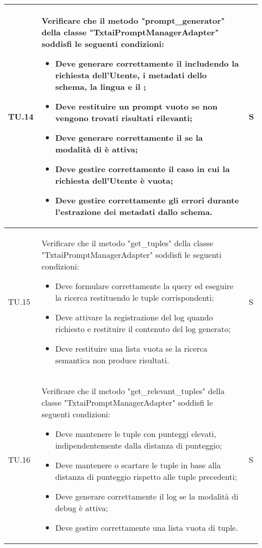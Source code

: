 \begin{adjustwidth}{-0.5cm}{-0.5cm}
\begin{longtable}{|P{1.5cm}|>{\raggedright}P{9.5cm}|>{\arraybackslash}P{1.5cm}|}
		\hline TU.14 & Verificare che il metodo "prompt\_generator" della classe "TxtaiPromptManagerAdapter" soddisfi le seguenti condizioni:
		\begin{itemize}
			\item Deve generare correttamente il  includendo la richiesta dell'Utente, i metadati dello schema, la lingua e il ;
			\item Deve restituire un prompt vuoto se non vengono trovati risultati rilevanti;
			\item Deve generare correttamente il  se la modalità di  è attiva;
			\item Deve gestire correttamente il caso in cui la richiesta dell'Utente è vuota;
			\item Deve gestire correttamente gli errori durante l'estrazione dei metadati dallo schema.
		\end{itemize} & S \\

		\hline TU.15 & Verificare che il metodo "get\_tuples" della classe "TxtaiPromptManagerAdapter" soddisfi le seguenti condizioni:
		\begin{itemize}
			\item Deve formulare correttamente la query  ed eseguire la ricerca restituendo le tuple corrispondenti;
			\item Deve attivare la registrazione del log quando richiesto e restituire il contenuto del log generato;
			\item Deve restituire una lista vuota se la ricerca semantica non produce risultati.
		\end{itemize} & S \\

		\hline TU.16 & Verificare che il metodo "get\_relevant\_tuples" della classe "TxtaiPromptManagerAdapter" soddisfi le seguenti condizioni:
		\begin{itemize}
			\item Deve mantenere le tuple con punteggi elevati, indipendentemente dalla distanza di punteggio;
			\item Deve mantenere o scartare le tuple in base alla distanza di punteggio rispetto alle tuple precedenti;
			\item Deve generare correttamente il log se la modalità di debug è attiva;
			\item Deve gestire correttamente una lista vuota di tuple.
		\end{itemize} & S \\


\end{longtable}
\end{adjustwidth}
